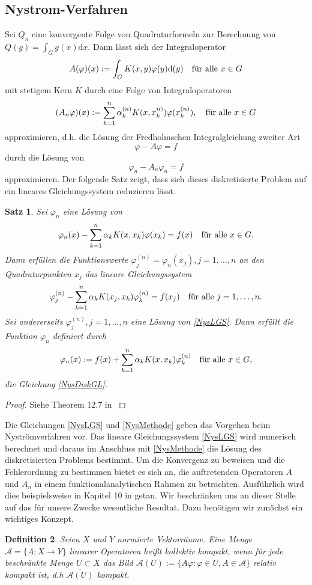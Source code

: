 \documentclass[12pt,a4paper]{scrartcl}
\newtheorem{Satz}{Satz}[section]
\newtheorem{Def}[Satz]{Definition}
\newcommand{\dd}{\mathrm{d}}
\numberwithin{equation}{section}
\newcommand{\fa}{\text{\quad für alle }}
\newcommand{\calA}{\mathcal{A}}
\begin{document}
\subsection{Nystrom-Verfahren} \label{chaNystrom}
Sei $Q_n$ eine konvergente Folge von Quadraturformeln zur Berechnung von $Q(g) = \int_G g(x) \dd x$. Dann lässt sich der Integraloperator
\[
  A(\varphi)(x):= \int_G K(x,y) \varphi(y) \dd(y) \fa x\in G
\]
mit stetigem Kern $K$ durch eine Folge von Integraloperatoren
\[
  (A_n\varphi)(x):=\sum_{k=1}^n \alpha_k^{(n)}K(x,x_k^{n)})\varphi(x_k^{(n)}), \fa x\in G
\]
approximieren, d.h. die Lösung der Fredholmschen Integralgleichung zweiter Art
\[
  \varphi -A \varphi = f
\]
durch die Lösung von
\[
  \varphi_n -A_n \varphi_n = f
\]
approximieren. Der folgende Satz zeigt, dass sich dieses diskretisierte Problem auf ein lineares Gleichungssystem reduzieren lässt.
\begin{Satz}
  Sei $\varphi_n$ eine Lösung von
  \begin{equation} \label{NysDiskGL}
   \varphi_n(x)-\sum_{k=1}^n \alpha_k K(x,x_k)\varphi(x_k)  = f(x) \fa x\in G.
  \end{equation}
  Dann erfüllen die Funktionswerte $\varphi_j^{(n)}=\varphi_n(x_j), j=1,\dots,n$ an den Quadraturpunkten $x_j$ das lineare Gleichungssystem
  \begin{equation} \label{NysLGS}
    \varphi_j^{(n)}-\sum_{k=1}^n \alpha_k K(x_j,x_k)\varphi_k^{(n)}=f(x_j) \fa j=1,\dots,n.
  \end{equation}
  Sei andererseits $\varphi_j^{(n)}, j=1,\dots,n$ eine Lösung von \eqref{NysLGS}. Dann erfüllt die Funktion $\varphi_n$ definiert durch
  \begin{equation} \label{NysMethode}
    \varphi_n(x):=f(x)+\sum_{k=1}^n\alpha_k K(x,x_k)\varphi_k^{(n)} \fa x \in G,
  \end{equation}
  die Gleichung \eqref{NysDiskGL}.
\end{Satz}
\begin{proof}
  Siehe Theorem 12.7 in \cite{kress}
\end{proof}
Die Gleichungen \eqref{NysLGS} und \eqref{NysMethode} geben das Vorgehen beim Nyströmverfahren vor. Das lineare Gleichungssystem \eqref{NysLGS} wird numerisch berechnet und daraus im Anschluss mit \eqref{NysMethode} die Lösung des diskretisierten Problems bestimmt. Um die Konvergenz zu beweisen und die Fehlerordnung zu bestimmen bietet es sich an, die auftretenden Operatoren $A$ und $A_n$ in einem funktionalanalytischen Rahmen zu betrachten. Ausführlich wird dies beispielsweise in Kapitel 10 in \cite{kress} getan. Wir beschränken uns an dieser Stelle auf das für unsere Zwecke wesentliche Resultat. Dazu benötigen wir zunächst ein wichtiges Konzept.
\begin{Def}
  Seien $X$ und $Y$ normierte Vektorräume. Eine Menge $\calA=\{A:X\to Y\}$ linearer Operatoren heißt \emph{kollektiv kompakt}, wenn für jede beschränkte Menge $ U \subset X$ das Bild $\calA(U):=\{A\varphi : \varphi \in U, A \in \calA\}$ relativ kompakt ist, d.h  $\overline{\calA(U)}$ kompakt. 
\end{Def}
\end{document}
